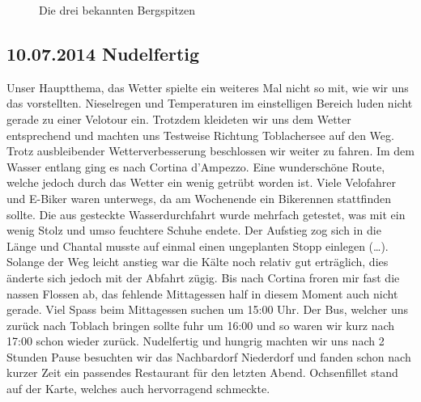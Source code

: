 \begin{figure}[hb]
   \centering
   \quad
   \quad
   \quad
   \caption[Die drei bekannten Bergspitzen]{Die drei bekannten Bergspitzen}
\end{figure}

\subsection{10.07.2014 Nudelfertig}
Unser Hauptthema, das Wetter spielte ein weiteres Mal nicht so mit, wie wir uns das vorstellten.
Nieselregen und Temperaturen im einstelligen Bereich luden nicht gerade zu einer Velotour ein.
Trotzdem kleideten wir uns dem Wetter entsprechend und machten uns Testweise Richtung Toblachersee auf den Weg.
Trotz ausbleibender Wetterverbesserung beschlossen wir weiter zu fahren.
Im dem Wasser entlang ging es nach Cortina d'Ampezzo.
Eine wunderschöne Route, welche jedoch durch das Wetter ein wenig getrübt worden ist.
Viele Velofahrer und E-Biker waren unterwegs, da am Wochenende ein Bikerennen stattfinden sollte.
Die aus gesteckte Wasserdurchfahrt wurde mehrfach getestet, was mit ein wenig Stolz und umso feuchtere Schuhe endete.
Der Aufstieg zog sich in die Länge und Chantal musste auf einmal einen ungeplanten Stopp einlegen (\dots ).
Solange der Weg leicht anstieg war die Kälte noch relativ gut erträglich, dies änderte sich jedoch mit der Abfahrt zügig.
Bis nach Cortina froren mir fast die nassen Flossen ab, das fehlende Mittagessen half in diesem Moment auch nicht gerade.
Viel Spass beim Mittagessen suchen um 15:00 Uhr.
Der Bus, welcher uns zurück nach Toblach bringen sollte fuhr um 16:00 und so waren wir kurz nach 17:00 schon wieder zurück.
Nudelfertig und hungrig machten wir uns nach 2 Stunden Pause besuchten wir das Nachbardorf Niederdorf und fanden schon nach kurzer Zeit ein passendes Restaurant für den letzten Abend.
Ochsenfillet stand auf der Karte, welches auch hervorragend schmeckte. 

